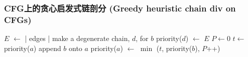 \begin{frame}
    \frametitle{CFG上的贪心启发式链剖分 (Greedy heuristic chain div on CFGs)}

    \begin{algorithmic}
        \State $E$ $\gets$ | edges |
        \State make a degenerate chain, $d$, for $b$
        \State priority($d$) $\gets$ $E$
        \EndFor
        \State $P \gets 0$
        \State $ t \gets $ priority($a$)
        \State append $b$ onto $a$
        \State priority($a$) $\gets$ $\min$ ($t$, priority($b$), $P$++)
        \EndFor
    \end{algorithmic}


\end{frame}

